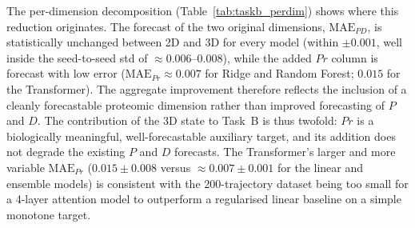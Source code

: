 \documentclass[5p,times,twocolumn]{elsarticle}
\begin{document}
\begin{table}[!htbp]
\caption{%
  Task B per-dimension MAE decomposition.
  The overall 3D MAE improvement (Table~\ref{tab:taskb})
  averages an easy-to-predict $Pr$ column into the mean;
  the per-dimension breakdown shows the $P$ and $D$ forecasts
  are statistically unchanged between 2D and 3D.
  $\text{MAE}_{PD}$ averages over the two original dimensions
  only. Mean $\pm$ std across 20 seeds.}
\label{tab:taskb_perdim}
\centering
{}
\end{table}

The per-dimension decomposition (Table~\ref{tab:taskb_perdim})
shows where this reduction originates.
The forecast of the two original dimensions, $\text{MAE}_{PD}$,
is statistically unchanged between 2D and 3D for every model
(within $\pm 0.001$, well inside the seed-to-seed std of
$\approx 0.006$--$0.008$), while the added $Pr$ column is
forecast with low error ($\text{MAE}_{Pr} \approx 0.007$ for
Ridge and Random Forest; $0.015$ for the Transformer).
The aggregate improvement therefore reflects the inclusion of a
cleanly forecastable proteomic dimension rather than improved
forecasting of $P$ and $D$.
The contribution of the 3D state to Task~B is thus twofold:
$Pr$ is a biologically meaningful, well-forecastable auxiliary
target, and its addition does not degrade the existing $P$ and
$D$ forecasts.
The Transformer's larger and more variable $\text{MAE}_{Pr}$
($0.015 \pm 0.008$ versus $\approx 0.007 \pm 0.001$ for the
linear and ensemble models) is consistent with the
200-trajectory dataset being too small for a 4-layer attention
model to outperform a regularised linear baseline on a simple
monotone target.
\end{document}
